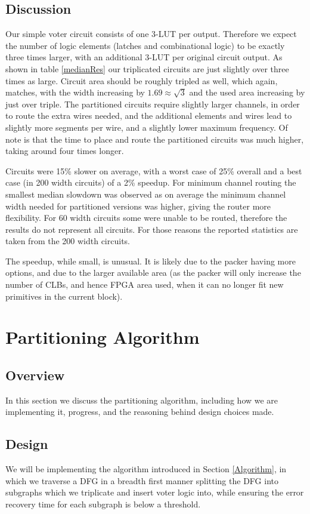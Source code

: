 \documentclass[12pt,final,oneside]{dwThesis} %
\begin{document}
\section{Discussion}
Our simple voter circuit consists of one 3-\ac{LUT} per output. Therefore we expect the number of logic elements (latches and combinational logic) to be exactly three times larger, with an additional 3-\ac{LUT} per original circuit output. As shown in table \ref{medianRes} our triplicated circuits are just slightly over three times as large. Circuit area should be roughly tripled as well, which again, matches, with the width increasing by $1.69 \approx \sqrt{3}$ and the used area increasing by just over triple. The partitioned circuits require slightly larger channels, in order to route the extra wires needed, and the additional elements and wires lead to slightly more segments per wire, and a slightly lower maximum frequency. Of note is that the time to place and route the partitioned circuits was much higher, taking around four times longer.

Circuits were 15\% slower on average, with a worst case of 25\% overall and a best case (in 200 width circuits) of a 2\% speedup. For minimum channel routing the smallest median slowdown was observed as on average the minimum channel width needed for partitioned versions was higher, giving the router more flexibility. For 60 width circuits some were unable to be routed, therefore the results do not represent all circuits. For those reasons the reported statistics are taken from the 200 width circuits.

The speedup, while small, is unusual. It is likely due to the packer having more options, and due to the larger available area (as the packer will only increase the number of \acp{CLB}, and hence \ac{FPGA} area used, when it can no longer fit new primitives in the current block).


\chapter{Partitioning Algorithm}
\section{Overview}
In this section we discuss the partitioning algorithm, including how we are implementing it, progress, and the reasoning behind design choices made.
\section{Design}
We will be implementing the algorithm introduced in Section \ref{Algorithm}, in which we traverse a \ac{DFG} in a breadth first manner splitting the \ac{DFG} into subgraphs which we triplicate and insert voter logic into, while ensuring the error recovery time for each subgraph is below a threshold.
\end{document}
